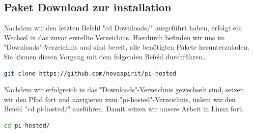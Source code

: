 \documentclass[a4paper]{article}
\begin{document}
\subsection{Paket Download zur installation}
Nachdem wir den letzten Befehl "cd Downloads/" ausgeführt haben, erfolgt ein Wechsel in das zuvor erstellte Verzeichnis. Hierdurch befinden wir uns im "Downloads"-Verzeichnis und sind bereit, alle benötigten Pakete herunterzuladen. Sie können diesen Vorgang mit dem folgenden Befehl durchführen…
\begin{lstlisting}[language=bash, caption={Paket Download}, breaklines=false]
	git clone https://github.com/novaspirit/pi-hosted
\end{lstlisting}
Nachdem wir erfolgreich in das "Downloads"-Verzeichnis gewechselt sind, setzen wir den Pfad fort und navigieren zum "pi-hosted"-Verzeichnis, indem wir den Befehl "cd pi-hosted/" ausführen. Damit setzen wir unsere Arbeit in Linux fort.
\begin{lstlisting}[language=bash, caption={pi hosted Ordner betreten}, breaklines=false]
cd pi-hosted/
\end{lstlisting}
\end{document}
